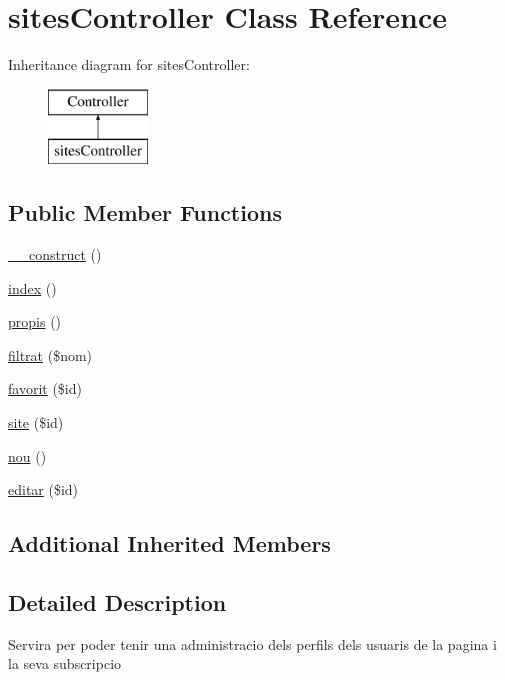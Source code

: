 \hypertarget{classsites_controller}{}\section{sites\+Controller Class Reference}
\label{classsites_controller}
Inheritance diagram for sites\+Controller\+:\begin{figure}[H]
\begin{center}
\leavevmode
\includegraphics[height=2.000000cm]{classsites_controller}
\end{center}
\end{figure}
\subsection*{Public Member Functions}
\begin{DoxyCompactItemize}
\item 
\hyperlink{classsites_controller_a095c5d389db211932136b53f25f39685}{\+\_\+\+\_\+construct} ()
\item 
\hyperlink{classsites_controller_a149eb92716c1084a935e04a8d95f7347}{index} ()
\item 
\hyperlink{classsites_controller_afed06176a9061fabf9cfbe04761e248c}{propis} ()
\item 
\hyperlink{classsites_controller_af04e5064c876440cf6fc6ec5562d7be6}{filtrat} (\$nom)
\item 
\hyperlink{classsites_controller_a47b88439946b0914d3b1be2a0c3bff62}{favorit} (\$id)
\item 
\hyperlink{classsites_controller_a05afcb085218a3b3225648008d4d786f}{site} (\$id)
\item 
\hyperlink{classsites_controller_a9f444607aa13beef472d0ce7109a0f1d}{nou} ()
\item 
\hyperlink{classsites_controller_a399b37729bdaca122345a17794f0fcb7}{editar} (\$id)
\end{DoxyCompactItemize}
\subsection*{Additional Inherited Members}


\subsection{Detailed Description}
Servira per poder tenir una administracio dels perfils dels usuaris de la pagina i la seva subscripcio


